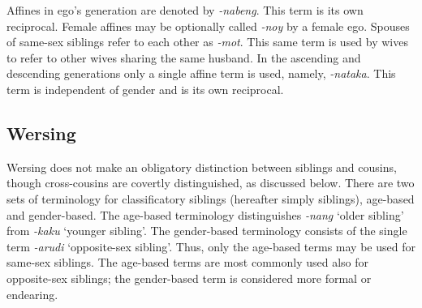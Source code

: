 
Affines in ego's generation are denoted by \textit{-nabeng}. This term is its own reciprocal. Female affines may be optionally called \textit{-noy} by a female ego. Spouses of same-sex siblings refer to each other as \textit{-mot}. This same term is used by wives to refer to other wives sharing the same husband. In the ascending and descending generations only a single affine term is used, namely, \textit{-nataka}. This term is independent of gender and is its own reciprocal. 
 




\subsection{Wersing}\label{sect_wersing}
Wersing does not make an obligatory distinction between siblings and cousins, though cross-cousins are covertly distinguished, as discussed below. There are two sets of terminology for classificatory siblings (hereafter simply siblings), age-based and gender-based. The age-based terminology distinguishes \textit{-nang} `older sibling' from \textit{-kaku} `younger sibling'. The gender-based terminology consists of the single term \textit{-arudi} `opposite-sex sibling'. Thus, only the age-based terms may be used for same-sex siblings. The age-based terms are most commonly used also for opposite-sex siblings; the gender-based term is considered more formal or endearing.

